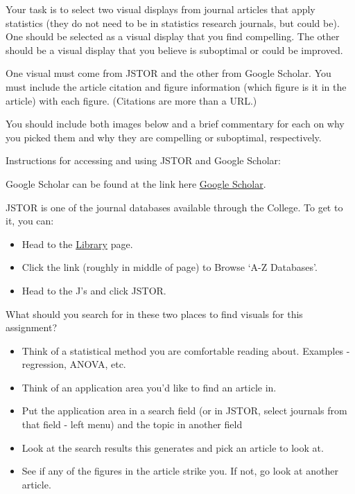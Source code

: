 \documentclass[
]{article}
\providecommand{\tightlist}{%
  \setlength{\itemsep}{0pt}\setlength{\parskip}{0pt}}
\begin{document}
Your task is to select two visual displays from journal articles that
apply statistics (they do not need to be in statistics research
journals, but could be). One should be selected as a visual display that
you find compelling. The other should be a visual display that you
believe is suboptimal or could be improved.

One visual must come from JSTOR and the other from Google Scholar. You
must include the article citation and figure information (which figure
is it in the article) with each figure. (Citations are more than a URL.)

You should include both images below and a brief commentary for each on
why you picked them and why they are compelling or suboptimal,
respectively.

Instructions for accessing and using JSTOR and Google Scholar:

Google Scholar can be found at the link here
\href{https://scholar.google.com/}{Google Scholar}.

JSTOR is one of the journal databases available through the College. To
get to it, you can:

\begin{itemize}
\tightlist
\item
  Head to the \href{https://www.amherst.edu/library}{Library} page.
\item
  Click the link (roughly in middle of page) to Browse `A-Z Databases'.
\item
  Head to the J's and click JSTOR.
\end{itemize}

What should you search for in these two places to find visuals for this
assignment?

\begin{itemize}
\tightlist
\item
  Think of a statistical method you are comfortable reading about.
  Examples - regression, ANOVA, etc.
\item
  Think of an application area you'd like to find an article in.
\item
  Put the application area in a search field (or in JSTOR, select
  journals from that field - left menu) and the topic in another field
\item
  Look at the search results this generates and pick an article to look
  at.
\item
  See if any of the figures in the article strike you. If not, go look
  at another article.
\end{itemize}
\end{document}

